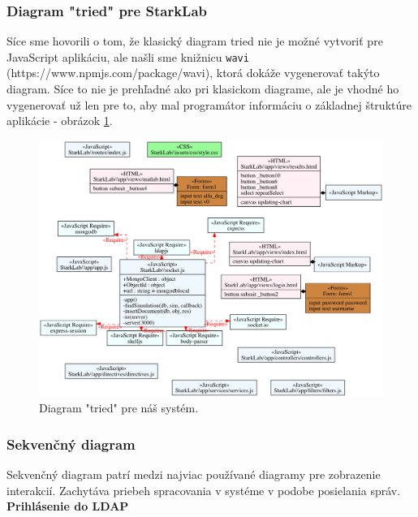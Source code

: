 \subsubsection{Diagram "tried" pre StarkLab}
Síce sme hovorili o tom, že klasický diagram tried nie je možné vytvoriť pre JavaScript aplikáciu, ale našli sme knižnicu \verb|wavi| (https://www.npmjs.com/package/wavi), ktorá dokáže vygenerovať takýto diagram. Síce to nie je prehľadné ako pri klasickom diagrame, ale je vhodné ho vygenerovať už len pre to, aby mal programátor informáciu o základnej štruktúre aplikácie - obrázok \ref{img-class-diagram}.

\begin{figure}[H]
  \centering
  \includegraphics[scale=0.40]{img/diagrams/class.png}
  \caption{Diagram "tried" pre náš systém.}
  \label{img-class-diagram}
\end{figure}

\subsubsection{Sekvenčný diagram}\label{diagram-sequence-section}
Sekvenčný diagram patrí medzi najviac používané diagramy pre zobrazenie interakcií. Zachytáva priebeh spracovania v systéme v podobe posielania správ.\\


\noindent \textbf{Prihlásenie do LDAP}


